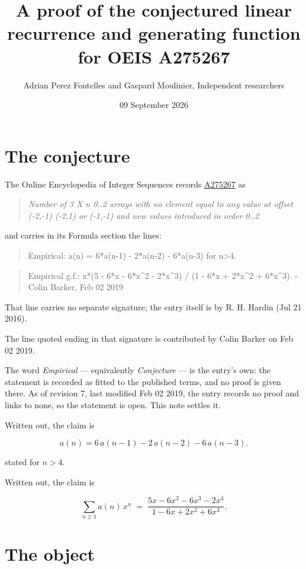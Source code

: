 \documentclass[11pt]{article}
\title{A proof of the conjectured linear recurrence and generating function for OEIS A275267}
\author{Adrian Perez Fontelles and Gaspard Moulinier, Independent researchers}
\date{09 September 2026}
\theoremstyle{definition}
\begin{document}
\maketitle
\section{The conjecture}

The Online Encyclopedia of Integer Sequences records \href{https://oeis.org/A275267}{A275267} as

\begin{quote}\itshape Number of 3 X n 0..2 arrays with no element equal to any value at offset (-2,-1) (-2,1) or (-1,-1) and new values introduced in order 0..2\end{quote}

and carries in its Formula section the lines:

\begin{quote}\ttfamily Empirical: a(n) = 6*a(n-1) - 2*a(n-2) - 6*a(n-3) for n>4.\end{quote}

\begin{quote}\ttfamily Empirical g.f.: x*(5 - 6*x - 6*x\textasciicircum{}2 - 2*x\textasciicircum{}3) / (1 - 6*x + 2*x\textasciicircum{}2 + 6*x\textasciicircum{}3). - Colin Barker, Feb 02 2019\end{quote}

That line carries no separate signature; the entry itself is by R. H. Hardin (Jul 21 2016).

The line quoted ending in that signature is contributed by Colin Barker on Feb 02 2019.

The word {\itshape Empirical} --- equivalently {\itshape Conjecture} --- is the entry's own: the statement is recorded as fitted to the published terms, and no proof is given there. As of revision 7, last modified Feb 02 2019, the entry records no proof and links to none, so the statement is open. This note settles it.

Written out, the claim is

\[a(n) = 6\,a(n-1) - 2\,a(n-2) - 6\,a(n-3).\]

stated for $n > 4$.

Written out, the claim is

\[\sum_{n \ge 1} a(n)\,x^n \;=\; \frac{5x - 6x^{2} - 6x^{3} - 2x^{4}}{1 - 6x + 2x^{2} + 6x^{3}}.\]

\section{The object}
\end{document}
